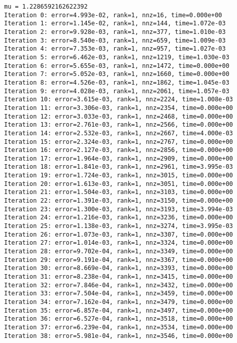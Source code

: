 \documentclass[11pt]{article}
\begin{document}
    \begin{Verbatim}[commandchars=\\\{\}]
mu = 1.2286592162622392
Iteration 0: error=4.993e-02, rank=1, nnz=16, time=0.000e+00
Iteration 1: error=1.145e-02, rank=1, nnz=144, time=1.072e-03
Iteration 2: error=9.928e-03, rank=1, nnz=377, time=1.010e-03
Iteration 3: error=8.540e-03, rank=1, nnz=659, time=1.009e-03
Iteration 4: error=7.353e-03, rank=1, nnz=957, time=1.027e-03
Iteration 5: error=6.462e-03, rank=1, nnz=1219, time=1.030e-03
Iteration 6: error=5.655e-03, rank=1, nnz=1472, time=0.000e+00
Iteration 7: error=5.052e-03, rank=1, nnz=1660, time=0.000e+00
Iteration 8: error=4.526e-03, rank=1, nnz=1862, time=1.045e-03
Iteration 9: error=4.028e-03, rank=1, nnz=2061, time=1.057e-03
Iteration 10: error=3.615e-03, rank=1, nnz=2224, time=1.008e-03
Iteration 11: error=3.306e-03, rank=1, nnz=2354, time=0.000e+00
Iteration 12: error=3.033e-03, rank=1, nnz=2468, time=0.000e+00
Iteration 13: error=2.761e-03, rank=1, nnz=2566, time=0.000e+00
Iteration 14: error=2.532e-03, rank=1, nnz=2667, time=4.000e-03
Iteration 15: error=2.324e-03, rank=1, nnz=2767, time=0.000e+00
Iteration 16: error=2.127e-03, rank=1, nnz=2856, time=0.000e+00
Iteration 17: error=1.964e-03, rank=1, nnz=2909, time=0.000e+00
Iteration 18: error=1.841e-03, rank=1, nnz=2961, time=3.995e-03
Iteration 19: error=1.724e-03, rank=1, nnz=3015, time=0.000e+00
Iteration 20: error=1.613e-03, rank=1, nnz=3051, time=0.000e+00
Iteration 21: error=1.504e-03, rank=1, nnz=3103, time=0.000e+00
Iteration 22: error=1.391e-03, rank=1, nnz=3150, time=0.000e+00
Iteration 23: error=1.300e-03, rank=1, nnz=3193, time=3.994e-03
Iteration 24: error=1.216e-03, rank=1, nnz=3236, time=0.000e+00
Iteration 25: error=1.138e-03, rank=1, nnz=3274, time=3.995e-03
Iteration 26: error=1.073e-03, rank=1, nnz=3307, time=0.000e+00
Iteration 27: error=1.014e-03, rank=1, nnz=3324, time=0.000e+00
Iteration 28: error=9.702e-04, rank=1, nnz=3349, time=0.000e+00
Iteration 29: error=9.191e-04, rank=1, nnz=3367, time=0.000e+00
Iteration 30: error=8.669e-04, rank=1, nnz=3393, time=0.000e+00
Iteration 31: error=8.238e-04, rank=1, nnz=3415, time=0.000e+00
Iteration 32: error=7.846e-04, rank=1, nnz=3432, time=0.000e+00
Iteration 33: error=7.504e-04, rank=1, nnz=3459, time=0.000e+00
Iteration 34: error=7.162e-04, rank=1, nnz=3479, time=0.000e+00
Iteration 35: error=6.857e-04, rank=1, nnz=3497, time=0.000e+00
Iteration 36: error=6.527e-04, rank=1, nnz=3518, time=0.000e+00
Iteration 37: error=6.239e-04, rank=1, nnz=3534, time=0.000e+00
Iteration 38: error=5.981e-04, rank=1, nnz=3546, time=0.000e+00

\end{Verbatim}
\end{document}
